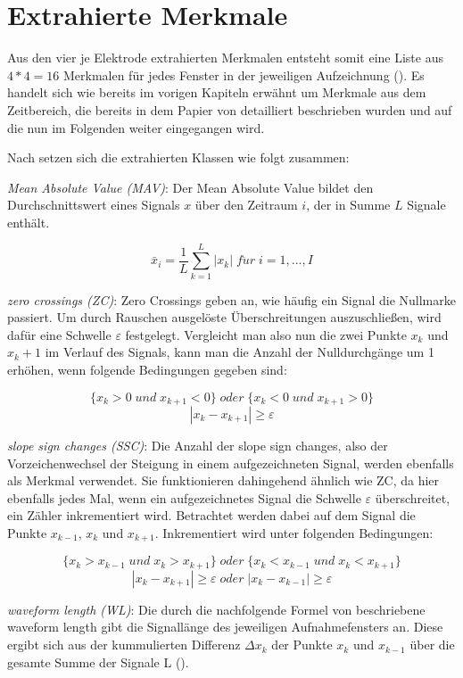 \section{Extrahierte Merkmale}

Aus den vier je Elektrode extrahierten Merkmalen entsteht somit eine Liste aus $4 * 4 = 16$ Merkmalen für jedes Fenster in der jeweiligen Aufzeichnung (\cite{Kaufmann2013Data}). Es handelt sich wie bereits im vorigen Kapiteln erwähnt um Merkmale aus dem Zeitbereich, die bereits in dem Papier von \cite{zecca2002control} detailliert beschrieben wurden und auf die nun im Folgenden weiter eingegangen wird.

Nach \cite{Engelhart2003} setzen sich die extrahierten Klassen wie folgt zusammen:

\textit{Mean Absolute Value (MAV)}:
Der Mean Absolute Value bildet den Durchschnittswert eines Signals $x$ über den Zeitraum $i$, der in Summe $L$ Signale enthält.

$$\bar{x}_i = \frac{1}{L}\sum_{k=1}^{L}|x_k|\;f\ddot{u}r\;i=1,...,I$$

\textit{zero crossings (ZC)}:
Zero Crossings geben an, wie häufig ein Signal die Nullmarke passiert. Um durch Rauschen ausgelöste Überschreitungen auszuschließen, wird dafür eine Schwelle $\varepsilon$ festgelegt. Vergleicht man also nun die zwei Punkte $x_k$ und $x_k+1$ im Verlauf des Signals, kann man die Anzahl der Nulldurchgänge um 1 erhöhen, wenn folgende Bedingungen gegeben sind:

$$\{x_k > 0 \;und\; x_{k+1} < 0\}\;oder\;\{x_k < 0\;und\;x_{k+1} > 0\}$$
$$|x_k - x_{k + 1}| \geq \varepsilon$$


\textit{slope sign changes (SSC)}:
Die Anzahl der slope sign changes, also der Vorzeichenwechsel der Steigung in einem aufgezeichneten Signal, werden ebenfalls als Merkmal verwendet. Sie funktionieren dahingehend ähnlich wie ZC, da hier ebenfalls jedes Mal, wenn ein aufgezeichnetes Signal die Schwelle $\varepsilon$ überschreitet, ein Zähler inkrementiert wird. Betrachtet werden dabei auf dem Signal die Punkte $x_{k - 1}$, $x_k$ und $x_{k+1}$. Inkrementiert wird unter folgenden Bedingungen:

$$\{x_k > x_{k-1}\;und\;x_k > x_{k+1}\}\;oder\;\{x_k < x_{k-1}\;und\;x_k<x_{k+1}\}$$
$$|x_k-x_{k+1}|\geq\varepsilon\;oder\;|x_k-x_{k-1}|\geq\varepsilon$$

\textit{waveform length (WL)}:
Die durch die nachfolgende Formel von \cite{Engelhart2003} beschriebene waveform length gibt die Signallänge des jeweiligen Aufnahmefensters an. Diese ergibt sich aus der kummulierten Differenz $\Delta{x_k}$ der Punkte $x_k$ und $x_{k-1}$ über die gesamte Summe der Signale L (\cite{Engelhart2003}).

